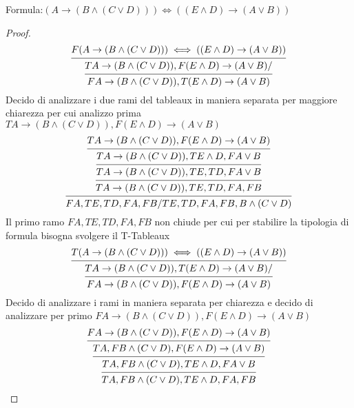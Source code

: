 Formula:$(A \rightarrow (B \land (C \lor D))) \iff ((E \land D) \rightarrow (A \lor B))$
\begin{proof}
\begin{equation*}
\begin{prooftree}
    \hypo{F (A \rightarrow (B \land (C \lor D))) \iff ((E \land D) \rightarrow (A \lor B))}
    \infer1{T A \rightarrow (B \land (C \lor D)),F (E \land D) \rightarrow (A \lor B)/}
    \infer1{F A \rightarrow (B \land (C \lor D)),T (E \land D) \rightarrow (A \lor B)}
\end{prooftree}
\end{equation*}
Decido di analizzare i due rami del tableaux in maniera separata per maggiore chiarezza
per cui analizzo prima $T A \rightarrow (B \land (C \lor D)),F (E \land D) \rightarrow (A \lor B)$
\begin{equation*}
\begin{prooftree}
\hypo{T A \rightarrow (B \land (C \lor D)),F (E \land D) \rightarrow (A \lor B)}
\infer1 {T A \rightarrow (B \land (C \lor D)),T E \land D,F A \lor B}
\infer1 {T A \rightarrow (B \land (C \lor D)),TE,TD,F A \lor B}
\infer1 {T A \rightarrow (B \land (C \lor D)),TE,TD,FA,FB}
\infer1 {FA,TE,TD,FA,FB/TE,TD,FA,FB,B \land (C \lor D)}
\end{prooftree}
\end{equation*}
Il primo ramo $FA,TE,TD,FA,FB$ non chiude per cui per stabilire la tipologia di
formula bisogna svolgere il T-Tableaux
\begin{equation*}
\begin{prooftree}
\hypo{T (A \rightarrow (B \land (C \lor D))) \iff ((E \land D) \rightarrow (A \lor B))}
\infer1 {T A \rightarrow (B \land (C \lor D)), T (E \land D) \rightarrow (A \lor B)/}
\infer1 {F A \rightarrow (B \land (C \lor D)),F (E \land D) \rightarrow (A \lor B)}
\end{prooftree}
\end{equation*}
Decido di analizzare i rami in maniera separata per chiarezza e decido di analizzare
per primo $F A \rightarrow (B \land (C \lor D)),F (E \land D) \rightarrow (A \lor B)$
\begin{equation*}
\begin{prooftree}
\hypo{F A \rightarrow (B \land (C \lor D)),F (E \land D) \rightarrow (A \lor B)}
\infer1{TA,F B \land (C \lor D),F (E \land D) \rightarrow (A \lor B)}
\infer1{TA,F B \land (C \lor D),T E \land D,F A \lor B}
\infer1{TA,F B \land (C \lor D),T E \land D,FA,FB}
\end{prooftree}

\end{equation*}
\end{proof}
